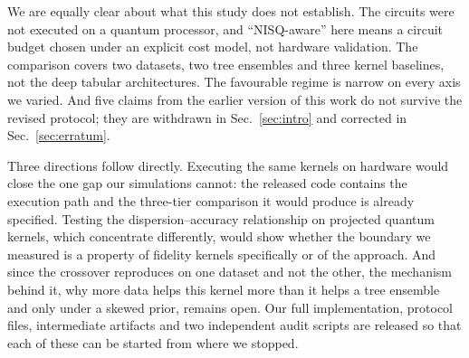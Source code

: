 \begin{revbody}
We are equally clear about what this study does not establish. The circuits were
not executed on a quantum processor, and ``NISQ-aware'' here means a circuit
budget chosen under an explicit cost model, not hardware validation. The
comparison covers two datasets, two tree ensembles and three kernel baselines,
not the deep tabular architectures. The favourable regime is narrow on every
axis we varied. And five claims from the earlier version of this work do not
survive the revised protocol; they are withdrawn in Sec.~\ref{sec:intro} and
corrected in Sec.~\ref{sec:erratum}.

Three directions follow directly. Executing the same kernels on hardware would
close the one gap our simulations cannot: the released code contains the
execution path and the three-tier comparison it would produce is already
specified. Testing the dispersion--accuracy relationship on projected quantum
kernels, which concentrate differently, would show whether the boundary we
measured is a property of fidelity kernels specifically or of the approach.
And since the crossover reproduces on one dataset and not the other, the
mechanism behind it, why more data helps this kernel more than it helps a
tree ensemble and only under a skewed prior, remains open. Our full
implementation, protocol files, intermediate artifacts and two independent audit
scripts are released so that each of these can be started from where we stopped.
\end{revbody}
